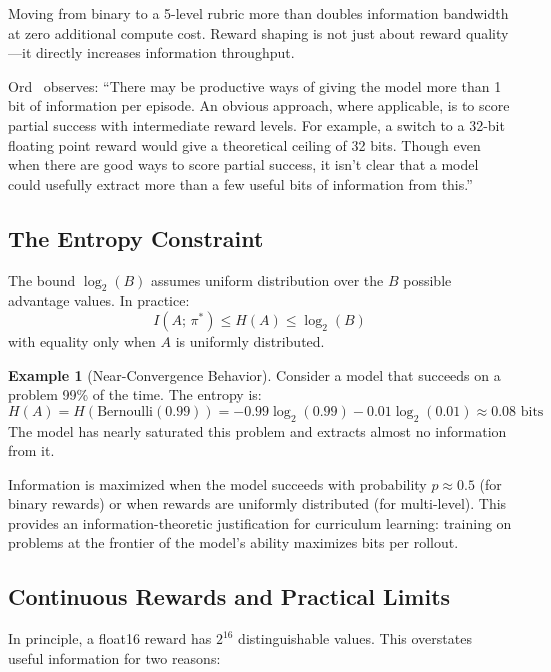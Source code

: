 \documentclass[11pt,a4paper]{article}
\theoremstyle{definition}
\newtheorem{example}[theorem]{Example}
\theoremstyle{remark}
\begin{document}
\begin{takeaway}
Moving from binary to a 5-level rubric more than doubles information bandwidth at zero additional compute cost. Reward shaping is not just about reward quality---it directly increases information throughput.
\end{takeaway}

Ord~\cite{ord2025} observes: ``There may be productive ways of giving the model more than 1 bit of information per episode. An obvious approach, where applicable, is to score partial success with intermediate reward levels. For example, a switch to a 32-bit floating point reward would give a theoretical ceiling of 32 bits. Though even when there are good ways to score partial success, it isn't clear that a model could usefully extract more than a few useful bits of information from this.''

\subsection{The Entropy Constraint}

The bound $\log_2(B)$ assumes uniform distribution over the $B$ possible advantage values. In practice:
\[
I(A;\, \pi^*) \leq H(A) \leq \log_2(B)
\]
with equality only when $A$ is uniformly distributed.

\begin{example}[Near-Convergence Behavior]
Consider a model that succeeds on a problem 99\% of the time. The entropy is:
\[
H(A) = H(\text{Bernoulli}(0.99)) = -0.99 \log_2(0.99) - 0.01 \log_2(0.01) \approx 0.08 \text{ bits}
\]
The model has nearly saturated this problem and extracts almost no information from it.
\end{example}

\begin{keyresult}
Information is maximized when the model succeeds with probability $p \approx 0.5$ (for binary rewards) or when rewards are uniformly distributed (for multi-level). This provides an information-theoretic justification for curriculum learning: training on problems at the frontier of the model's ability maximizes bits per rollout.
\end{keyresult}

\subsection{Continuous Rewards and Practical Limits}

In principle, a float16 reward has $2^{16}$ distinguishable values. This overstates useful information for two reasons:
\end{document}
